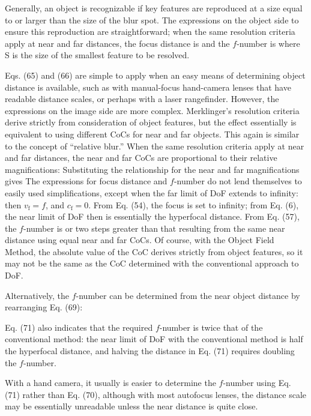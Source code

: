 \documentclass[11pt, oneside]{scrartcl}   	%
\begin{document}
Generally, an object is recognizable if key features are reproduced at a size equal to or larger than the size of the blur spot. The expressions on the object side to ensure this reproduction are straightforward; when the same resolution criteria apply at near and far distances, the focus distance is
and the $f$-number is
where S is the size of the smallest feature to be resolved.

Eqs. (65) and (66) are simple to apply when an easy means of determining object
distance is available, such as with manual-focus hand-camera lenses that have readable distance scales, or perhaps with a laser rangefinder. However, the expressions on the image side are more complex. Merklinger’s resolution criteria derive strictly from consideration of object features, but the effect essentially is equivalent to using different CoCs for near and far objects. This again is similar to the concept of “relative blur.” When the same resolution criteria apply at near and far distances, the near and far CoCs are proportional to their relative magnifications:
Substituting the relationship
for the near and far magnifications gives
The expressions for focus distance and $f$-number do not lend themselves to easily used simplifications, except when the far limit of DoF extends to infinity: then $v_\mathrm{f} = f$, and $c_\mathrm{f} = 0$. From Eq. (54), the focus is set to infinity; from Eq. (6), the near limit of DoF then is
essentially the hyperfocal distance. From Eq. (57), the $f$-number is
or two steps greater than that resulting from the same near distance using equal near and far CoCs. Of course, with the Object Field Method, the absolute value of the CoC derives strictly from object features, so it may not be the same as the CoC determined with the conventional approach to DoF.

Alternatively, the $f$-number can be determined from the near object distance by rearranging Eq. (69):

Eq. (71) also indicates that the required $f$-number is twice that of the conventional method: the near limit of DoF with the conventional method is half the hyperfocal distance, and halving the distance in Eq. (71) requires doubling the $f$-number.

With a hand camera, it usually is easier to determine the $f$-number using Eq. (71) rather than Eq. (70), although with most autofocus lenses, the distance scale may be essentially unreadable unless the near distance is quite close.
\end{document}
